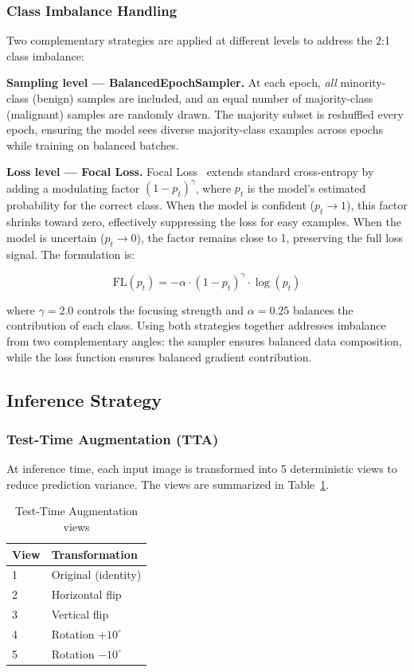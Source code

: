 \documentclass[conference]{IEEEtran}
\begin{document}
\subsubsection{Class Imbalance Handling}

\medskip
Two complementary strategies are applied at different levels to address the 2:1 class
imbalance:

\textbf{Sampling level --- BalancedEpochSampler.} At each epoch, \textit{all}
minority-class (benign) samples are included, and an equal number of majority-class
(malignant) samples are randomly drawn. The majority subset is reshuffled every epoch,
ensuring the model sees diverse majority-class examples across epochs while training on
balanced batches.

\textbf{Loss level --- Focal Loss.} Focal Loss~\cite{Lin2017Focal} extends standard
cross-entropy by adding a modulating factor $(1 - p_t)^{\gamma}$, where $p_t$ is the
model's estimated probability for the correct class. When the model is confident
($p_t \rightarrow 1$), this factor shrinks toward zero, effectively suppressing the loss for
easy examples. When the model is uncertain ($p_t \rightarrow 0$), the factor remains close to
1, preserving the full loss signal. The formulation is:

\begin{equation}
  \mathrm{FL}(p_t) = -\alpha \cdot (1 - p_t)^{\gamma} \cdot \log(p_t)
\end{equation}

where $\gamma = 2.0$ controls the focusing strength and $\alpha = 0.25$ balances the
contribution of each class. Using both strategies together addresses imbalance from two
complementary angles: the sampler ensures balanced data composition, while the loss function
ensures balanced gradient contribution.

\subsection{Inference Strategy}

\subsubsection{Test-Time Augmentation (TTA)}

At inference time, each input image is transformed into 5 deterministic views to reduce
prediction variance. The views are summarized in Table~\ref{tab:tta_table}.

\begin{table}[t]
  \caption{Test-Time Augmentation views}
  \label{tab:tta_table}
  \centering
  \begin{tabular}{ll}
    \toprule
    \textbf{View} & \textbf{Transformation} \\
    \midrule
    1 & Original (identity) \\
    2 & Horizontal flip \\
    3 & Vertical flip \\
    4 & Rotation $+10^{\circ}$ \\
    5 & Rotation $-10^{\circ}$ \\
    \bottomrule
  \end{tabular}
\end{table}
\end{document}
